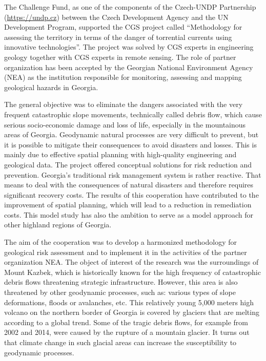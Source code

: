 {The Challenge Fund, as one of the components of the Czech-UNDP Partnership (\url{https://undp.cz}) between the Czech Development Agency and the UN Development Program, supported the CGS project called \enquote{Methodology for assessing the territory in terms of the danger of torrential currents using innovative technologies}. The project was solved by CGS experts in engineering geology together with CGS experts in remote sensing. The role of partner organization has been accepted by the Georgian National Environment Agency (NEA) as the institution responsible for monitoring, assessing and mapping geological hazards in Georgia. 

The general objective was to eliminate the dangers associated with the very frequent catastrophic slope movements, technically called debris flow, which cause serious socio-economic damage and loss of life, especially in the mountainous areas of Georgia. Geodynamic natural processes are very difficult to prevent, but it is possible to mitigate their consequences to avoid disasters and losses. This is mainly due to effective spatial planning with high-quality engineering and geological data. The project offered conceptual solutions for risk reduction and prevention. Georgia's traditional risk management system is rather reactive. That means to deal with the consequences of natural disasters and therefore requires significant recovery costs. The results of this cooperation have contributed to the improvement of spatial planning, which will lead to a reduction in remediation costs. This model study has also the ambition to serve as a model approach for other highland regions of Georgia.

The aim of the cooperation was to develop a harmonized methodology for geological risk assessment and to implement it in the activities of the partner organization NEA. The object of interest of the research was the surroundings of Mount Kazbek, which is historically known for the high frequency of catastrophic debris flows threatening strategic infrastructure. However, this area is also threatened by other geodynamic processes, such as: various types of slope deformations, floods or avalanches, etc. This relatively young 5,000 meters high volcano on the northern border of Georgia is covered by glaciers that are melting according to a global trend. Some of the tragic debris flows, for example from 2002 and 2014, were caused by the rupture of a mountain glacier. It turns out that climate change in such glacial areas can increase the susceptibility to geodynamic processes. 

}
